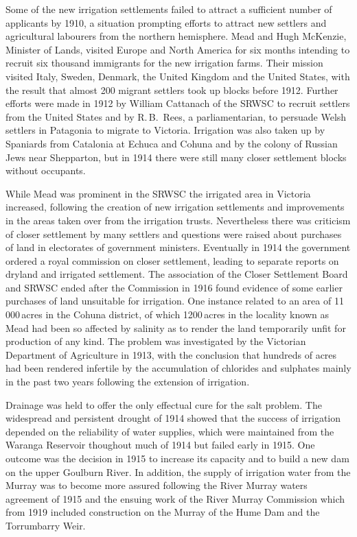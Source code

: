 Some of the new irrigation settlements failed to attract a sufficient
number of applicants by 1910, a situation prompting efforts to attract
new settlers and agricultural labourers from the northern hemisphere.
Mead and Hugh McKenzie, Minister of Lands, visited Europe and Nor\-th
America for six months intending to recruit six thousand immigrants
for the new irrigation farms. Their mission visited Italy, Sweden,
Denmark, the United Kingdom and the United States, with the result
that almost 200 migrant settlers took up blocks before 1912.  Further
efforts were made in 1912 by William Cattanach of the SRWSC to recruit
settlers from the United States and by R.\,B.~Rees, a parliamentarian,
to persuade Welsh settlers in Patagonia to migrate to Victoria.
Irrigation was also taken up by Spaniards from Catalonia at Echuca and
Cohuna and by the colony of Russian Jews near Shepparton, but in 1914
there were still many closer settlement blocks without occupants.

While Mead was prominent in the SRWSC the irrigated area in Victoria
increased, following the creation of new irrigation settlements and
improvements in the areas taken over from the irrigation trusts.
Nevertheless there was criticism of closer settlement by many settlers
and questions were raised about purchases of land in electorates of
government ministers.  Eventually in 1914 the government ordered a
royal commission on closer settlement, leading to separate reports on
dryland and irrigated settlement.  The association of the Closer
Settlement Board and SRWSC ended after the Commission in 1916 found
evidence of some earlier purchases of land unsuitable for irrigation.
One instance related to an area of 11\,000\,acres in the Cohuna
district, of which 1200\,acres in the locality known as Mead had been
so affected by salinity  as to render the land
temporarily unfit for production of any kind.  The problem was
investigated by the Victorian Department of Agriculture in 1913, with
the conclusion that hundreds of acres had been rendered infertile by
the accumulation of chlorides and sulphates mainly in the past two
years following the extension of irrigation.

Drainage  was held to offer the only effectual cure
for the salt problem.  The widespread and persistent drought of 1914
showed that the success of irrigation depended on the reliability of
water supplies, wh\-ich were maintained from the Waranga Reservoir
thoughout much of 1914 but failed early in 1915.  One outcome was the
decision in 1915 to increase its capacity and to build a new dam on
the upper Goulburn River.  In addition, the
supply of irrigation water from the Murray was to become more assured
following the River Murray waters agreement of 1915 and the ensuing
work of the River Murray Commission which from 1919 included
construction on the Murray of the Hume Dam 
 and the
Torrumbarry Weir.

